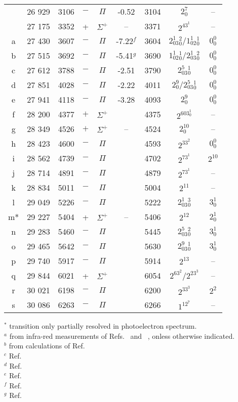 \documentclass[journal=jacsat,manuscript=suppinfo]{achemso}
\newcommand{\onlinecite}[1]{\hspace{-1 ex} \nocite{#1}\citenum{#1}}
\begin{document}
\begin{table*}
\begin{tabular}{c c c c c c c c c}
		& 26 929 & 3106 & $-$ & $\Pi$ & -0.52 & 3104 & $2^7_0$ & -- \\
		& 27 175 & 3352 & + & $\Sigma^+$ & -- & 3371 & $2^43^1$ & --\\
		a & 27 430 & 3607 & $-$ & $\Pi$ & -7.22$^{f}$ & 3604 & $2^1_03^2_0/1^1_02^1_0$ & $0^0_0$ \\
		b & 27 515 & 3692 & $-$ & $\Pi$ & -5.41$^{g}$ & 3690 & $1^1_02^1_0/2^1_03^2_0$ & $0^0_0$ \\
		c & 27 612 & 3788 & $-$ & $\Pi$ & -2.51 & 3790 & $2^5_03^1_0$ & $0^0_0$ \\
		d & 27 851 & 4028 & $-$ & $\Pi$ & -2.22 & 4011 & $2^9_0/2^5_03^1_0$ & $0^0_0$ \\
		e & 27 941 & 4118 & $-$ & $\Pi$ & -3.28 & 4093 & $2^9_0$ & $0^0_0$ \\
		f & 28 200 & 4377 & $+$ & $\Sigma^+$ & & 4375 & $2^603^1_0$ & -- \\
		g & 28 349 & 4526 & $+$ & $\Sigma^+$ & -- & 4524 & $2^{10}_0$ & -- \\
		h  & 28 423 & 4600 & $-$ & $\Pi$ & & 4593 & $2^33^2$ & $0^0_0$ \\
		i & 28 562 & 4739 & $-$ & $\Pi$ & & 4702 & $2^73^1$ & $2^10$ \\
		j & 28 714 & 4891 & $-$ & $\Pi$ & & 4879 & $2^73^1$ & -- \\
		k   & 28 834 & 5011 & $-$ & $\Pi$ & & 5004 &$2^{11}$ & -- \\  
		l & 29 049 & 5226 & $-$ & $\Pi$ & & 5222 & $2^1_03^3_0$ & $3^1_0$ \\
		m* & 29 227 & 5404 & + & $\Sigma^+$ & -- & 5406 & $2^{12}$ & $2^1_0$\\
		n & 29 283 & 5460 & $-$ & $\Pi$ & & 5445  & $2^5_03^2_0$ & $3^1_0$ \\
		o & 29 465 & 5642 & $-$ & $\Pi$ & & 5630  & $2^9_03^1_0$ & $3^1_0$ \\
		p  & 29 740 & 5917 & $-$ & $\Pi$ & & 5914 & $2^{13}$ & --\\
		q & 29 844 & 6021 & + & $\Sigma^+$ & & 6054 & $2^63^2/2^23^3$ & --\\
		r & 30 021 & 6198 & $-$ & $\Pi$ & & 6200 & $2^33^3$ & $2^2$\\
		s & 30 086 & 6263 & $-$ & $\Pi$ & & 6266 & $1^12^7$ & --\\
	\end{tabular}
	
	\raggedright
	$^*$ transition only partially resolved in photoelectron spectrum. \\
	$^a$ from infra-red measurements of Refs.~\onlinecite{chi99} and~\onlinecite{yen95}, onless otherwise indicated.\\
	$^b$ from calculations of Ref.~\onlinecite{tar03}\\
	$^c$ Ref.~\onlinecite{kan88}\\
	$^d$ Ref.~\onlinecite{yen93}\\
	$^e$ Ref.~\onlinecite{yan93}\\
	$^f$ Ref.~\onlinecite{yan87}\\
	$^g$ Ref.~\onlinecite{cur85}
\end{table*}
\end{document}
